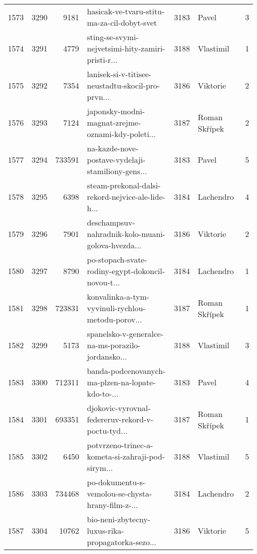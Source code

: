 \begin{tabular}{lrrlrlr}
1573 &       3290 &     9181 &        hasicak-ve-tvaru-stitu-ma-za-cil-dobyt-svet &     3183 &                        Pavel &               3 \\
1574 &       3291 &     4779 &  sting-se-svymi-nejvetsimi-hity-zamiri-pristi-r... &     3188 &                    Vlastimil &               1 \\
1575 &       3292 &     7354 &  lanisek-si-v-titisee-neustadtu-skocil-pro-prvn... &     3186 &                     Viktorie &               2 \\
1576 &       3293 &     7124 &  japonsky-modni-magnat-zrejme-oznami-kdy-poleti... &     3187 &                Roman Skřípek &               2 \\
1577 &       3294 &   733591 &  na-kazde-nove-postave-vydelaji-stamiliony-gens... &     3183 &                        Pavel &               5 \\
1578 &       3295 &     6398 &  steam-prekonal-dalsi-rekord-nejvice-ale-lide-h... &     3184 &                    Lachendro &               4 \\
1579 &       3296 &     7901 &  deschampsuv-nahradnik-kolo-muani-golova-hvezda... &     3186 &                     Viktorie &               2 \\
1580 &       3297 &     8790 &  po-stopach-svate-rodiny-egypt-dokoncil-novou-t... &     3184 &                    Lachendro &               1 \\
1581 &       3298 &   723831 &  konvalinka-a-tym-vyvinuli-rychlou-metodu-porov... &     3187 &                Roman Skřípek &               1 \\
1582 &       3299 &     5173 &  spanelsko-v-generalce-na-ms-porazilo-jordansko... &     3188 &                    Vlastimil &               3 \\
1583 &       3300 &   712311 &  banda-podcenovanych-ma-plzen-na-lopate-kdo-to-... &     3183 &                        Pavel &               4 \\
1584 &       3301 &   693351 &  djokovic-vyrovnal-federeruv-rekord-v-poctu-tyd... &     3187 &                Roman Skřípek &               1 \\
1585 &       3302 &     6450 &  potvrzeno-trinec-a-kometa-si-zahraji-pod-sirym... &     3188 &                    Vlastimil &               5 \\
1586 &       3303 &   734468 &  po-dokumentu-s-vemolou-se-chysta-hrany-film-z-... &     3184 &                    Lachendro &               2 \\
1587 &       3304 &    10762 &  bio-neni-zbytecny-luxus-rika-propagatorka-sezo... &     3186 &                     Viktorie &               5 \\

\end{tabular}
